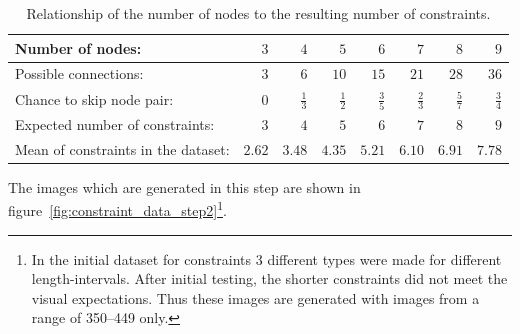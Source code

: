 \begin{table}
\caption{Relationship of the number of nodes to the resulting number of constraints.}\label{tab:relation_nodes_constraints}
\begin{tabular}{lrrrrrrr}
    \toprule
    Number of nodes: & \(3\) & \(4\) & \(5\) & \(6\) & \(7\) & \(8\) & \(9\) \\
    \midrule
    Possible connections: & \(3\) & \(6\) & \(10\) & \(15\) & \(21\) & \(28\) & \(36\) \\
    \midrule
    Chance to skip node pair: & \(0\) & \(\frac{1}{3}\) & \(\frac{1}{2}\) & \(\frac{3}{5}\) & \(\frac{2}{3}\) & \(\frac{5}{7}\) & \(\frac{3}{4}\) \\
    \midrule
    Expected number of constraints: & \(3\) & \(4\) & \(5\) & \(6\) & \(7\) & \(8\) & \(9\) \\
    \midrule
    Mean of constraints in the dataset: & \(2.62\) & \(3.48\) & \(4.35\) & \(5.21\) & \(6.10\) & \(6.91\) & \(7.78\) \\
    \bottomrule
\end{tabular}
\end{table}

The images which are generated in this step are shown in figure~\ref{fig:constraint_data_step2}\footnote{In the initial dataset for constraints 3 different types were made for different length-intervals. After initial testing, the shorter constraints did not meet the visual expectations. Thus these images are generated with images from a range of 350--449 only.}.

